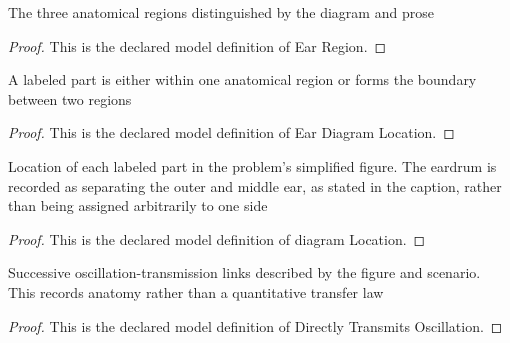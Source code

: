 \begin{definition}
  \label{def:physics:phyx-mini-0189:phyxminiproblems-problemphyxmini0189-earregion}
  The three anatomical regions distinguished by the diagram and prose
\end{definition}
\begin{proof}
  This is the declared model definition of Ear Region.
\end{proof}
\begin{definition}
  \label{def:physics:phyx-mini-0189:phyxminiproblems-problemphyxmini0189-eardiagramlocation}
  A labeled part is either within one anatomical region or forms the boundary between two regions
\end{definition}
\begin{proof}
  This is the declared model definition of Ear Diagram Location.
\end{proof}
\begin{definition}
  \label{def:physics:phyx-mini-0189:phyxminiproblems-problemphyxmini0189-earpart-diagramlocation}
  Location of each labeled part in the problem's simplified figure. The eardrum is recorded as separating the outer and middle ear, as stated in the caption, rather than being assigned arbitrarily to one side
\end{definition}
\begin{proof}
  This is the declared model definition of diagram Location.
\end{proof}
\begin{definition}
  \label{def:physics:phyx-mini-0189:phyxminiproblems-problemphyxmini0189-directlytransmitsoscillation}
  Successive oscillation-transmission links described by the figure and scenario. This records anatomy rather than a quantitative transfer law
\end{definition}
\begin{proof}
  This is the declared model definition of Directly Transmits Oscillation.
\end{proof}
